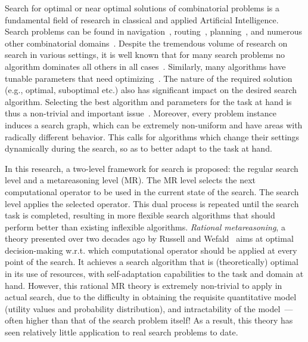 Search for optimal or near optimal solutions of combinatorial problems
is a fundamental field of research in classical and applied Artificial
Intelligence. Search problems can be found in
navigation~\cite{Kocsis.uct}, routing~\cite{Bellman.routing},
planning~\cite{Domshlak.maxornot}, and numerous other combinatorial
domains~\cite{Korf.partitioning,Braudis.pachi}.  Despite the
tremendous volume of research on search in various settings, it is
well known that for many search problems no algorithm dominates all
others in all cases~\cite{Wolpert.nofree}. Similarly, many algorithms
have tunable parameters that need
optimizing~\cite{Hutter.spo,TolpinShimony.raticomp}. The nature of the
required solution (e.g., optimal, suboptimal etc.) also has
significant impact on the desired search algorithm. Selecting the best
algorithm and parameters for the task at hand is thus a non-trivial
and important issue~\cite{Allen.selheur,Gomes.portfolio}. Moreover, every problem
instance induces a search graph, which can be extremely non-uniform
and have areas with radically different behavior. This calls for
algorithms which change their settings dynamically during the search,
so as to better adapt to the task at hand.

In this research, a two-level framework for search is proposed: the
regular search level and a metareasoning level (MR). The MR level
selects the next computational operator to be used in the current
state of the search. The search level applies the selected
operator. This dual process is repeated until the search task is
completed, resulting in more flexible search algorithms that should
perform better than existing inflexible algorithms.  \textit{Rational
metareasoning}, a theory presented over two decades ago by Russell and
Wefald~\cite{Russell.right} aims at optimal decision-making
w.r.t. which computational operator should be applied at every point
of the search. It achieves a search algorithm that is (theoretically)
optimal in its use of resources, with self-adaptation capabilities to
the task and domain at hand. However, this rational MR theory is
extremely non-trivial to apply in actual search, due to the difficulty
in obtaining the requisite quantitative model (utility values and
probability distribution), and intractability of the
model~\cite{Conitzer.complexity}---often higher than that of the
search problem itself!  As a result, this theory has seen relatively
little application to real search problems to date.

